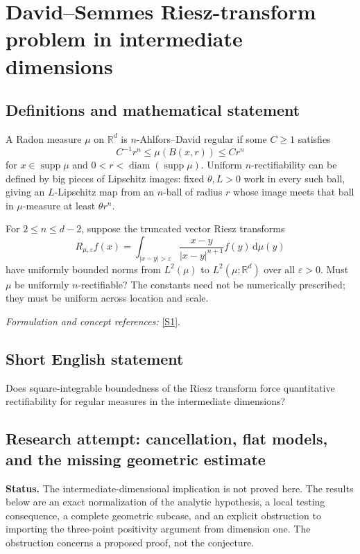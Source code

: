 \documentclass[11pt]{article}
\begin{document}
\section*{\texorpdfstring{David–Semmes Riesz-transform problem in intermediate dimensions}{David–Semmes Riesz-transform problem in intermediate dimensions}}\label{470}
\subsection{Definitions and mathematical statement}
A Radon measure $\mu$ on ${\mathbb{R}}^d$ is $n$-Ahlfors--David regular if some $C\ge1$ satisfies
\[
 C^{-1}r^n\le\mu(B(x,r))\le Cr^n
\]
for $x\in\operatorname{supp}\mu$ and $0<r<\operatorname{diam}(\operatorname{supp}\mu)$. Uniform $n$-rectifiability can be defined by big pieces of Lipschitz images: fixed $\theta,L>0$ work in every such ball, giving an $L$-Lipschitz map from an $n$-ball of radius $r$ whose image meets that ball in $\mu$-measure at least $\theta r^n$.

For $2\le n\le d-2$, suppose the truncated vector Riesz transforms
\[
 R_{\mu,{\varepsilon}}f(x)=\int_{|x-y|>{\varepsilon}}
 \frac{x-y}{|x-y|^{n+1}}f(y){\,\mathrm{d}}\mu(y)
\]
have uniformly bounded norms from $L^2(\mu)$ to $L^2(\mu;{\mathbb{R}}^d)$ over all ${\varepsilon}>0$. Must $\mu$ be uniformly $n$-rectifiable? The constants need not be numerically prescribed; they must be uniform across location and scale.
\par\smallskip\textit{Formulation and concept references:} \href{https://arxiv.org/html/2509.26547}{[S1]}.

\subsection{Short English statement}
Does square-integrable boundedness of the Riesz transform force quantitative rectifiability for regular measures in the intermediate dimensions?
\subsection{Research attempt: cancellation, flat models, and the missing geometric estimate}
\textbf{Status.} The intermediate-dimensional implication is not proved here. The results below are an exact normalization of the analytic hypothesis, a local testing consequence, a complete geometric subcase, and an explicit obstruction to importing the three-point positivity argument from dimension one. The obstruction concerns a proposed proof, not the conjecture.
\end{document}

